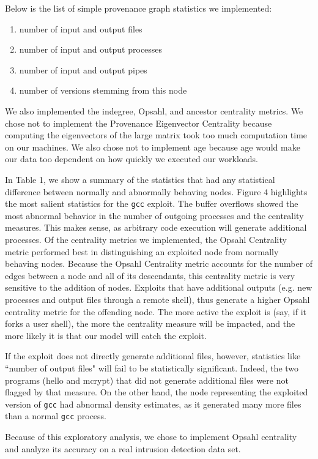 \documentclass[10pt,twocolumn]{article}
\begin{document}
Below is the list of simple provenance graph statistics we implemented:
\begin{enumerate}
\item number of input and output files
\item number of input and output processes
\item number of input and output pipes
\item number of versions stemming from this node
\end{enumerate}
We also implemented the indegree, Opsahl, and ancestor centrality metrics.
We chose not to implement the Provenance Eigenvector Centrality because computing
the eigenvectors of the large matrix took too much computation time on our machines.
We also chose not to implement age because age would make our data too dependent
on how quickly we executed our workloads.

In Table 1, we show a summary of the statistics that had any statistical difference between normally and abnormally behaving nodes. Figure 4 highlights the most salient statistics for the \texttt{gcc} exploit. The buffer overflows showed the most abnormal behavior in the number of outgoing processes and the centrality measures. This makes sense, as arbitrary code execution will generate additional processes. Of the centrality metrics we implemented, the Opsahl Centrality metric performed best in distinguishing an exploited node from normally behaving nodes. Because the Opsahl Centrality metric accounts for the number of edges between a node and all of its descendants, this centrality metric is very sensitive to the addition of nodes. Exploits that have additional outputs (e.g. new processes and output files through a remote shell), thus generate a higher Opsahl centrality metric for the offending node. The more active the exploit is (say, if it forks a user shell), the more the centrality measure will be impacted, and the more likely it is that our model will catch the exploit.

If the exploit does not directly generate additional files, however, statistics like ``number of output files" will fail to be statistically significant. Indeed, the two programs (hello and mcrypt) that did not generate additional files were not flagged by that measure. On the other hand, the node representing the exploited version of \texttt{gcc} had abnormal density estimates, as it generated many more files than a normal \texttt{gcc} process. 

Because of this exploratory analysis, we chose to implement Opsahl centrality and analyze its accuracy on a real intrusion detection data set.
\end{document}

